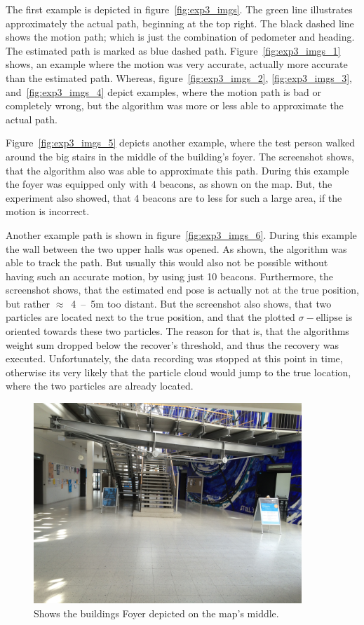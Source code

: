The first example is depicted in figure~\ref{fig:exp3_imgs}. The green line illustrates approximately the actual path, beginning at the top right. The black dashed line shows the motion path; which is just the combination of pedometer and heading. The estimated path is marked as blue dashed path. Figure~\ref{fig:exp3_imgs_1} shows, an example where the motion was very accurate, actually more accurate than the estimated path. Whereas, figure~\ref{fig:exp3_imgs_2}, \ref{fig:exp3_imgs_3}, and~\ref{fig:exp3_imgs_4} depict examples, where the motion path is bad or completely wrong, but the algorithm was more or less able to approximate the actual path.

Figure~\ref{fig:exp3_imgs_5} depicts another example, where the test person walked around the big stairs in the middle of the building's foyer. The screenshot shows, that the algorithm also was able to approximate this path. During this example the foyer was equipped only with 4 beacons, as shown on the map. But, the experiment also showed, that 4 beacons are to less for such a large area, if the motion is incorrect.

Another example path is shown in figure~\ref{fig:exp3_imgs_6}. During this example the wall between the two upper halls was opened. As shown, the algorithm was able to track the path. But usually this would also not be possible without having such an accurate motion, by using just 10 beacons. Furthermore, the screenshot shows, that the estimated end pose is actually not at the true position, but rather $\approx$~4~--~5m too distant. But the screenshot also shows, that two particles are located next to the true position, and that the plotted $\sigma-\text{ellipse}$ is oriented towards these two particles. The reason for that is, that the algorithms weight sum dropped below the recover's threshold, and thus the recovery was executed. Unfortunately, the data recording was stopped at this point in time, otherwise its very likely that the particle cloud would jump to the true location, where the two particles are already located. 


\begin{figure}
	\includegraphics[width=0.9\textwidth]{figures/F-Foyer}
	\caption{Shows the buildings Foyer depicted on the map's middle.}
	\label{fig:f-foyer}
\end{figure}

